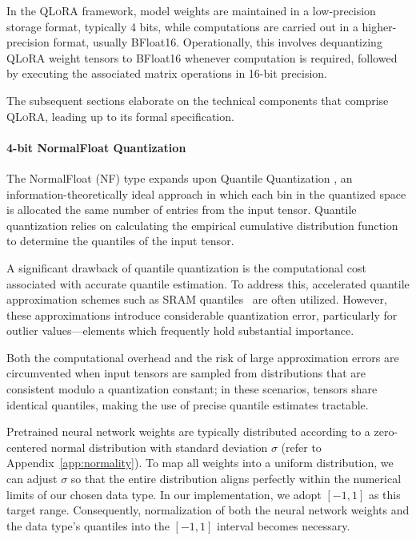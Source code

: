 In the \textsc{QLoRA} framework, model weights are maintained in a low-precision storage format, typically 4 bits, while computations are carried out in a higher-precision format, usually BFloat16. Operationally, this involves dequantizing \textsc{QLoRA} weight tensors to BFloat16 whenever computation is required, followed by executing the associated matrix operations in 16-bit precision.

The subsequent sections elaborate on the technical components that comprise \textsc{QLoRA}, leading up to its formal specification.

\paragraph{4-bit NormalFloat Quantization} The NormalFloat (NF) type expands upon Quantile Quantization \citep{dettmers2022optimizers}, an information-theoretically ideal approach in which each bin in the quantized space is allocated the same number of entries from the input tensor. Quantile quantization relies on calculating the empirical cumulative distribution function to determine the quantiles of the input tensor.

A significant drawback of quantile quantization is the computational cost associated with accurate quantile estimation. To address this, accelerated quantile approximation schemes such as SRAM quantiles~\citep{dettmers2022optimizers} are often utilized. However, these approximations introduce considerable quantization error, particularly for outlier values—elements which frequently hold substantial importance.

Both the computational overhead and the risk of large approximation errors are circumvented when input tensors are sampled from distributions that are consistent modulo a quantization constant; in these scenarios, tensors share identical quantiles, making the use of precise quantile estimates tractable.

Pretrained neural network weights are typically distributed according to a zero-centered normal distribution with standard deviation $\sigma$ (refer to Appendix~\ref{app:normality}). To map all weights into a uniform distribution, we can adjust $\sigma$ so that the entire distribution aligns perfectly within the numerical limits of our chosen data type. In our implementation, we adopt $[-1, 1]$ as this target range. Consequently, normalization of both the neural network weights and the data type's quantiles into the $[-1, 1]$ interval becomes necessary.

